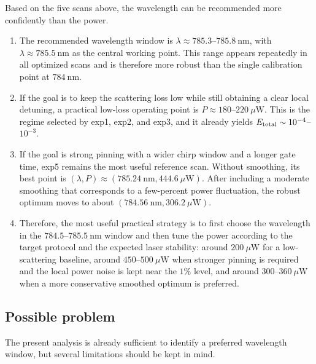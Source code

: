\documentclass[aps,%
onecolumn,%
floatfix,%
pra,%
amsfonts,%
longbibliography,%
groupedaddress,%
superscriptaddress]{revtex4-2}%
\newcommand{\1}{\mathbbm{1}}
\begin{document}
Based on the five scans above, the wavelength can be recommended more
confidently than the power.

\begin{enumerate}[label=(\arabic*)]
    \item The recommended wavelength window is
    $\lambda \approx 785.3$--$785.8~\mathrm{nm}$, with
    $\lambda \approx 785.5~\mathrm{nm}$ as the central working point. This
    range appears repeatedly in all optimized scans and is therefore more
    robust than the single calibration point at $784~\mathrm{nm}$.

    \item If the goal is to keep the scattering loss low while still obtaining
    a clear local detuning, a practical low-loss operating point is
    $P \approx 180$--$220~\mu\mathrm{W}$. This is the regime selected by exp1,
    exp2, and exp3, and it already yields
    $E_{\rm total}\sim 10^{-4}$--$10^{-3}$.

    \item If the goal is strong pinning with a wider chirp window and a longer
    gate time, exp5 remains the most useful reference scan. Without smoothing,
    its best point is
    $(\lambda,P)\approx(785.24~\mathrm{nm},444.6~\mu\mathrm{W})$. After
    including a moderate smoothing that corresponds to a few-percent power
    fluctuation, the robust optimum moves to about
    $(784.56~\mathrm{nm},306.2~\mu\mathrm{W})$.

    \item Therefore, the most useful practical strategy is to first choose the
    wavelength in the $784.5$--$785.5~\mathrm{nm}$ window and then tune the
    power according to the target protocol and the expected laser stability:
    around $200~\mu\mathrm{W}$ for a low-scattering baseline, around
    $450$--$500~\mu\mathrm{W}$ when stronger pinning is required and the local
    power noise is kept near the $1\%$ level, and around
    $300$--$360~\mu\mathrm{W}$ when a more conservative smoothed optimum is
    preferred.
\end{enumerate}

\subsection{Possible problem}

The present analysis is already sufficient to identify a preferred wavelength
window, but several limitations should be kept in mind.
\end{document}
